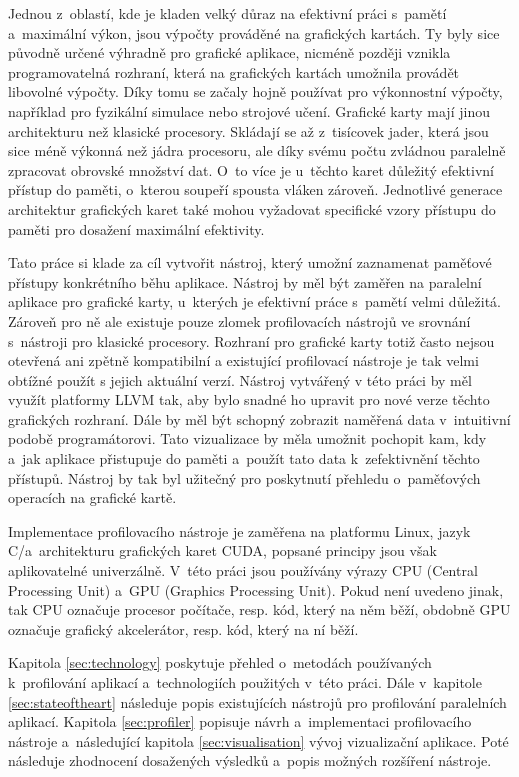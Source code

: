 Jednou z~oblastí, kde je kladen velký důraz na efektivní práci s~pamětí a~maximální výkon, jsou výpočty prováděné na grafických kartách. Ty byly sice původně určené výhradně pro grafické aplikace, nicméně později vznikla programovatelná rozhraní, která na grafických kartách umožnila provádět libovolné výpočty. Díky tomu se začaly hojně používat pro výkonnostní výpočty, například pro fyzikální simulace nebo strojové učení. Grafické karty mají jinou archi\-tekturu než klasické procesory. Skládají se až z~tisícovek jader, která jsou sice méně výkonná než jádra procesoru, ale díky svému počtu zvládnou paralelně zpracovat obrovské množství dat. O~to více je u~těchto karet důležitý efektivní přístup do paměti, o~kterou soupeří spousta vláken zároveň. Jednotlivé generace architektur grafických karet také mohou vyžadovat specifické vzory přístupu do paměti pro dosažení maximální efektivity.

Tato práce si klade za cíl vytvořit nástroj, který umožní zaznamenat paměťové přístupy konkrétního běhu aplikace. Nástroj by měl být zaměřen na paralelní aplikace pro grafické karty, u~kterých je efektivní práce s~pamětí velmi důležitá. Zároveň pro ně ale existuje pouze zlomek profilovacích nástrojů ve srovnání s~nástroji pro klasické procesory. Rozhraní pro grafické karty totiž často nejsou otevřená ani zpětně kompatibilní a existující profilovací nástroje je tak velmi obtížné použít s jejich aktuální verzí. Nástroj vytvářený v této práci by měl využít platformy LLVM tak, aby bylo snadné ho upravit pro nové verze těchto grafických rozhraní. Dále by měl být schopný zobrazit naměřená data v~intuitivní podobě programátorovi. Tato vizualizace by měla umožnit pochopit kam, kdy a~jak aplikace přistupuje do paměti a~použít tato data k~zefektivnění těchto přístupů. Nástroj by tak byl užitečný pro poskytnutí přehledu o~paměťových operacích na grafické kartě.

Implementace profilovacího nástroje je zaměřena na platformu Linux, jazyk C/\CPP \hspace{1mm}a~architekturu grafických karet CUDA, popsané principy jsou však aplikovatelné univerzálně. V~této práci jsou používány výrazy CPU (Central Processing Unit) a~GPU (Graphics Processing Unit). Pokud není uvedeno jinak, tak CPU označuje procesor počítače, resp. kód, který na něm běží, obdobně GPU označuje grafický akcelerátor, resp. kód, který na ní běží.

Kapitola \ref{sec:technology} poskytuje přehled o~metodách používaných k~profilování aplikací a~technologiích použitých v~této práci. Dále v~kapitole \ref{sec:stateoftheart} následuje popis existujících nástrojů pro profilování paralelních aplikací. Kapitola \ref{sec:profiler} popisuje návrh a~implementaci profilovacího nástroje a~následující kapitola \ref{sec:visualisation} vývoj vizualizační aplikace. Poté následuje zhodnocení dosažených výsledků a~popis možných rozšíření nástroje. 
